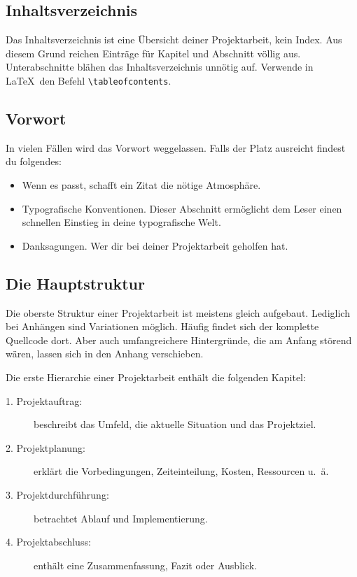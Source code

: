 \documentclass[a4paper,titlepage=true,twoside]{scrartcl}
\newcommand{\gquote}[1]{\glqq #1\grqq}
\begin{document}
\subsection{Inhaltsverzeichnis}
Das Inhaltsverzeichnis ist eine Übersicht deiner Projektarbeit, kein Index.
Aus diesem Grund reichen Einträge für Kapitel und Abschnitt völlig aus.
Unterabschnitte blähen das Inhaltsverzeichnis unnötig auf.
Verwende in \LaTeX\ den Befehl \verb!\tableofcontents!.





\subsection{Vorwort}
In vielen Fällen wird das Vorwort weggelassen. Falls der Platz ausreicht
findest du folgendes:

\begin{itemize}
 \item Wenn es passt, schafft ein Zitat die nötige Atmosphäre.
 \item Typografische Konventionen. Dieser Abschnitt ermöglicht dem Leser
  einen schnellen Einstieg in deine \gquote{typografische Welt}.
 \item Danksagungen. Wer dir bei deiner Projektarbeit geholfen hat.
\end{itemize}



\subsection{Die Hauptstruktur}
Die oberste Struktur einer Projektarbeit ist meistens gleich aufgebaut.
Lediglich bei Anhängen sind Variationen möglich. Häufig findet sich der
komplette Quellcode dort. Aber auch umfangreichere Hintergründe, die
am Anfang störend wären, lassen sich in den Anhang verschieben.

Die erste Hierarchie einer Projektarbeit enthält die folgenden Kapitel:

\begin{description}
 \item[1. Projektauftrag:] beschreibt das Umfeld, die aktuelle Situation und das Projektziel.
 \item[2. Projektplanung:] erklärt die Vorbedingungen, Zeiteinteilung, Kosten, Ressourcen u.~ä.
 \item[3. Projektdurchführung:] betrachtet Ablauf und Implementierung.
 \item[4. Projektabschluss:] enthält eine Zusammenfassung, Fazit oder Ausblick.
\end{description}
\end{document}
